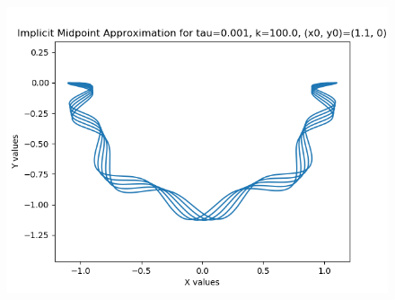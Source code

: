 \documentclass{article}
\theoremstyle{definition}
\begin{document}
\begin{itemize}
\begin{figure}[H]
			\includegraphics[scale=0.6]{mid_spring_0001_100}
		\end{figure}


\end{itemize}
\end{document}
